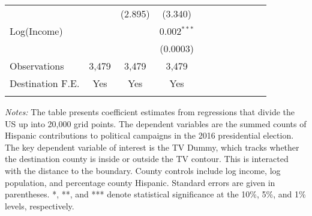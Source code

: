\begin{table}[!h]
{\begin{threeparttable}
\begin{tabular}{lcccccccccc}
  &  & (2.895) & (3.340) \\ 
 Log(Income) &  &  & 0.002$^{***}$ \\ 
  &  &  & (0.0003) \\ 
Observations & 3,479 & 3,479 & 3,479 \\     
\hline\addlinespace
                                Destination F.E. & Yes & Yes  & Yes\\
				\addlinespace\hline\hline
			\end{tabular}
			\begin{tablenotes}[flushleft]
				\item \textit{Notes:} The table presents coefficient estimates from regressions that divide the US up into 20,000 grid points. The dependent variables are the summed counts of Hispanic contributions to political campaigns in the 2016 presidential election. The key dependent variable of interest is the TV Dummy, which tracks whether the destination county is inside or outside the TV contour. This is interacted with the distance to the boundary. County controls include log income, log population, and percentage county Hispanic. Standard errors are given in parentheses. *, **, and *** denote statistical significance at the 10\%, 5\%, and 1\% levels, respectively.
			\end{tablenotes}
		\end{threeparttable}
	}
\end{table}